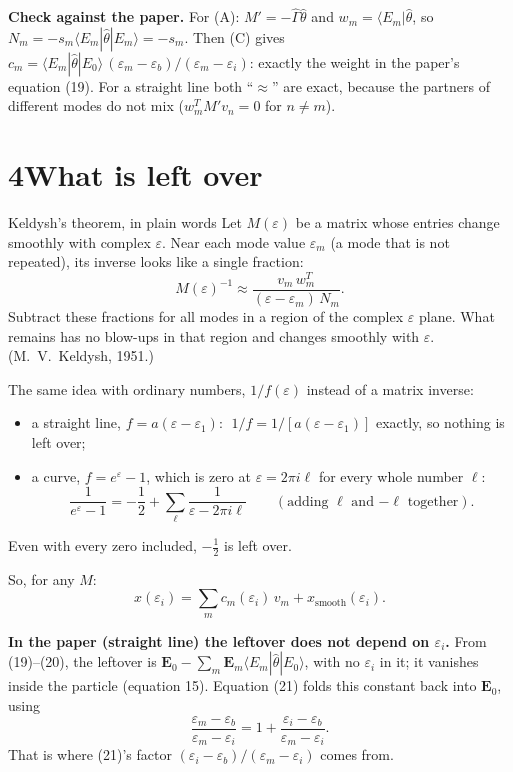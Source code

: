 \documentclass[11pt]{article}
\newcommand{\vb}[1]{\boldsymbol{#1}}
\newcommand{\eps}{\varepsilon}
\newcommand{\br}[1]{\langle #1 |}
\newcommand{\kt}[1]{| #1 \rangle}
\begin{document}
\textbf{Check against the paper.} For (A): $M'=-\hat\Gamma\hat\theta$ and $w_m=\br{E_m}\hat\theta$, so $N_m=-s_m\br{E_m}\hat\theta\kt{E_m}=-s_m$. Then (C) gives
$c_m=\br{E_m}\hat\theta\kt{E_0}\,(\eps_m-\eps_b)/(\eps_m-\eps_i)$: exactly the weight in the paper's equation (19). For a straight line both ``$\approx$'' are exact, because the partners of different modes do not mix ($w_m^TM'v_n=0$ for $n\neq m$).

\section*{4\quad What is left over}

\begin{plain}{Keldysh's theorem, in plain words}
Let $M(\eps)$ be a matrix whose entries change smoothly with complex $\eps$. Near each mode value $\eps_m$ (a mode that is not repeated), its inverse looks like a single fraction:
\[
M(\eps)^{-1}\approx \frac{v_m\,w_m^T}{(\eps-\eps_m)\,N_m}.
\]
Subtract these fractions for all modes in a region of the complex $\eps$ plane. What remains has no blow-ups in that region and changes smoothly with $\eps$. {\color{muted}(M.\ V.\ Keldysh, 1951.)}
\end{plain}

The same idea with ordinary numbers, $1/f(\eps)$ instead of a matrix inverse:
\begin{itemize}
\item a straight line, $f=a(\eps-\eps_1)$: $\;1/f=1/[a(\eps-\eps_1)]$ exactly, so nothing is left over;
\item a curve, $f=e^{\eps}-1$, which is zero at $\eps=2\pi i\ell$ for every whole number $\ell$:
\[
\frac1{e^{\eps}-1}=-\frac12+\sum_{\ell}\frac1{\eps-2\pi i \ell}\qquad(\text{adding $\ell$ and $-\ell$ together}).
\]
\end{itemize}
Even with every zero included, $-\tfrac12$ is left over.

So, for any $M$:
\begin{equation}
x(\eps_i)=\sum_m c_m(\eps_i)\,v_m+x_{\text{smooth}}(\eps_i).
\tag{D}
\end{equation}

\textbf{In the paper (straight line) the leftover does not depend on $\eps_i$.} From (19)--(20), the leftover is $\vb E_0-\sum_m \vb E_m\br{E_m}\hat\theta\kt{E_0}$, with no $\eps_i$ in it; it vanishes inside the particle (equation 15). Equation (21) folds this constant back into $\vb E_0$, using
\[
\frac{\eps_m-\eps_b}{\eps_m-\eps_i}=1+\frac{\eps_i-\eps_b}{\eps_m-\eps_i}.
\]
That is where (21)'s factor $(\eps_i-\eps_b)/(\eps_m-\eps_i)$ comes from.
\end{document}
